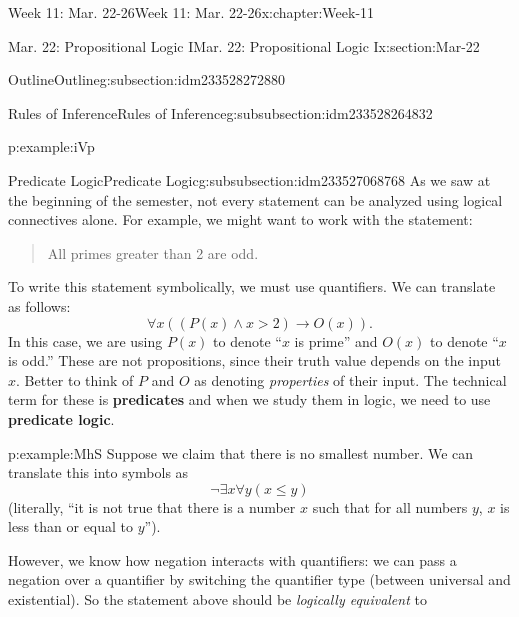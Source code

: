 \documentclass[oneside,10pt,]{book}
\newcommand{\tabularfont}{\relax}
\newcommand{\terminology}[1]{\textbf{#1}}
\numberwithin{equation}{section}
\newcommand{\hrulethin}  {\noalign{\hrule height 0.04em}}
\renewcommand{\le}{\leqslant}
\def\imp{\to}
\newcommand{\imp}{\rightarrow}
\newcommand{\gt}{>}
\begin{document}
\begin{chapterptx}{Week 11: Mar. 22-26}{}{Week 11: Mar. 22-26}{}{}{x:chapter:Week-11}
\begin{sectionptx}{Mar. 22: Propositional Logic I}{}{Mar. 22: Propositional Logic I}{}{}{x:section:Mar-22}
\begin{subsectionptx}{Outline}{}{Outline}{}{}{g:subsection:idm233528272880}
\begin{subsubsectionptx}{Rules of Inference}{}{Rules of Inference}{}{}{g:subsubsection:idm233528264832}
\begin{example}{}{p:example:iVp}
\begin{sidebyside}{1}{0}{0}{0}%
\begin{sbspanel}{1}%
\resizebox{\linewidth}{!}{%
{\centering%
{\tabularfont%
\begin{tabular}{cc}
&\(P \imp R\)\tabularnewline[0pt]
&\(Q \imp R\)\tabularnewline[0pt]
&\(P \vee Q\)\tabularnewline\hrulethin
\(\therefore\)&\(R\)
\end{tabular}
}%
\par}
}%
\end{sbspanel}%
\end{sidebyside}%
\end{example}
\end{subsubsectionptx}
%
%
\typeout{************************************************}
\typeout{************************************************}
%
\begin{subsubsectionptx}{Predicate Logic}{}{Predicate Logic}{}{}{g:subsubsection:idm233527068768}
As we saw at the beginning of the semester, not every statement can be analyzed using logical connectives alone. For example, we might want to work with the statement:%
\begin{quote}%
All primes greater than 2 are odd.%
\end{quote}
To write this statement symbolically, we must use quantifiers. We can translate as follows:%
\begin{equation*}
\forall x ((P(x) \wedge x \gt 2) \imp O(x))\text{.}
\end{equation*}
In this case, we are using \(P(x)\) to denote ``\(x\) is prime'' and \(O(x)\) to denote ``\(x\) is odd.'' These are not propositions, since their truth value depends on the input \(x\). Better to think of \(P\) and \(O\) as denoting \emph{properties} of their input. The technical term for these is \terminology{predicates} and when we study them in logic, we need to use \terminology{predicate logic}.%
\begin{example}{}{p:example:MhS}%
Suppose we claim that there is no smallest number. We can translate this into symbols as%
\begin{equation*}
\neg \exists x \forall y (x \le y)
\end{equation*}
(literally, ``it is not true that there is a number \(x\) such that for all numbers \(y\), \(x\) is less than or equal to \(y\)'').%
\par
However, we know how negation interacts with quantifiers: we can pass a negation over a quantifier by switching the quantifier type (between universal and existential). So the statement above should be \emph{logically equivalent} to%

\end{example}
\end{subsubsectionptx}
\end{subsectionptx}
\end{sectionptx}
\end{chapterptx}
\end{document}
